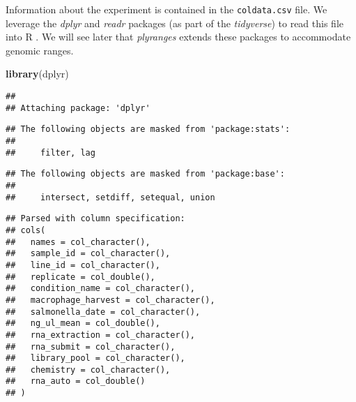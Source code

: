 \documentclass[
  9pt,
  a4paper,
]{extarticle}
\newenvironment{Shaded}{\begin{snugshade}}{\end{snugshade}}
\newcommand{\DataTypeTok}[1]{\textcolor[rgb]{0.13,0.29,0.53}{#1}}
\newcommand{\KeywordTok}[1]{\textcolor[rgb]{0.13,0.29,0.53}{\textbf{#1}}}
\newcommand{\NormalTok}[1]{#1}
\newcommand{\OperatorTok}[1]{\textcolor[rgb]{0.81,0.36,0.00}{\textbf{#1}}}
\newcommand{\StringTok}[1]{\textcolor[rgb]{0.31,0.60,0.02}{#1}}
\begin{document}
Information about the experiment is contained in the \texttt{coldata.csv} file. We
leverage the \emph{dplyr} and \emph{readr} packages (as part of the \emph{tidyverse}) to read
this file into R \citep{tidyverse}. We will see later that \emph{plyranges} extends these
packages to accommodate genomic ranges.

\begin{Shaded}
\begin{Highlighting}[]
\KeywordTok{library}\NormalTok{(dplyr)}
\end{Highlighting}
\end{Shaded}

\begin{verbatim}
## 
## Attaching package: 'dplyr'
\end{verbatim}

\begin{verbatim}
## The following objects are masked from 'package:stats':
## 
##     filter, lag
\end{verbatim}

\begin{verbatim}
## The following objects are masked from 'package:base':
## 
##     intersect, setdiff, setequal, union
\end{verbatim}

\begin{Shaded}
\end{Shaded}

\begin{verbatim}
## Parsed with column specification:
## cols(
##   names = col_character(),
##   sample_id = col_character(),
##   line_id = col_character(),
##   replicate = col_double(),
##   condition_name = col_character(),
##   macrophage_harvest = col_character(),
##   salmonella_date = col_character(),
##   ng_ul_mean = col_double(),
##   rna_extraction = col_character(),
##   rna_submit = col_character(),
##   library_pool = col_character(),
##   chemistry = col_character(),
##   rna_auto = col_double()
## )
\end{verbatim}
\end{document}
